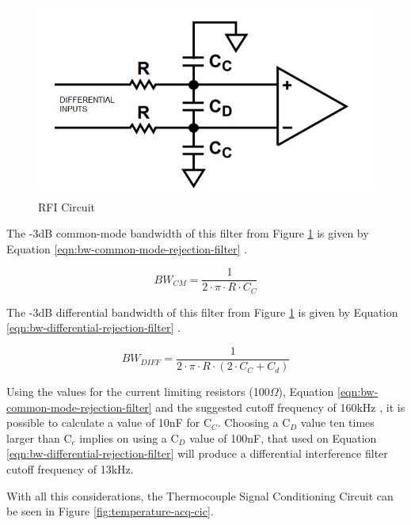 		\begin{figure}[htbp]
			\centering
				\includegraphics[width=.8\textwidth]{figuras/fig-rfi-standard-filter}
			\caption{RFI Circuit \cite{rfi-standard-filter}}
			\label{fig:rfi-standard-filter}
		\end{figure}

	The -3dB common-mode bandwidth of this filter from Figure \ref{fig:rfi-standard-filter} is given by Equation \ref{eqn:bw-common-mode-rejection-filter} \cite{analogDevDesignersGuide}.

		\begin{equation}\label{eqn:bw-common-mode-rejection-filter}
			BW_{CM}=\frac{1}{2 \cdot \pi \cdot R \cdot C_{C}}
		\end{equation}
	
	The -3dB differential bandwidth of this filter from Figure \ref{fig:rfi-standard-filter} is given by Equation \ref{eqn:bw-differential-rejection-filter} \cite{analogDevDesignersGuide}.
	
		\begin{equation}\label{eqn:bw-differential-rejection-filter}
			BW_{DIFF}=\frac{1}{2 \cdot \pi \cdot R \cdot \left( 2 \cdot C_{C} + C_{d} \right)}
		\end{equation}
		
	Using the values for the current limiting resistors (100$\Omega$), Equation \ref{eqn:bw-common-mode-rejection-filter} and the suggested cutoff frequency of 160kHz \cite{two-ways-thermocouple}, it is possible to calculate a value of 10nF for C$_{C}$. Choosing a C$_{D}$ value ten times larger than C$_{c}$ implies on using a C$_{D}$ value of 100nF, that used on Equation \ref{eqn:bw-differential-rejection-filter} will produce a differential interference filter cutoff frequency of 13kHz.
	\par
	With all this considerations, the Thermocouple Signal Conditioning Circuit can be seen in Figure \ref{fig:temperature-acq-cic}.

